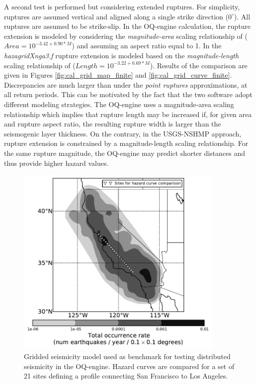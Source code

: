A second test is performed but considering extended ruptures. For simplicity, ruptures are assumed vertical and aligned along a single strike direction ($0^{\circ}$). All ruptures are assumed to be strike-slip. In the OQ-engine calculation, the rupture extension is modeled by considering the \textit{magnitude-area} scaling relationship of \cite{wells1994} ($Area = 10^{-3.42 + 0.90 * M}$) and assuming an aspect ratio equal to 1. In the \textit{hazagridXnga3.f} rupture extension is modeled based on the \textit{magnitude-length} scaling relationship of \cite{wells1994} ($Length = 10^{-3.22+0.69 * M}$). Results of the comparison are given in Figures \ref{fig:cal_grid_map_finite} and \ref{fig:cal_grid_curve_finite}. Discrepancies are much larger than under the \textit{point ruptures} approximations, at all return periods. This can be motivated by the fact that
the two software adopt different modeling strategies. The OQ-engine uses a magnitude-area scaling relationship which implies that rupture length may be increased if, for given area and rupture aspect ratio, the resulting rupture width is larger than the seismogenic layer thickness. On the contrary, in the USGS-NSHMP approach, rupture extension is constrained by a magnitude-length scaling relationship. For the same rupture magnitude, the OQ-engine may predict shorter distances and thus provide higher hazard values.

\begin{figure}
\centering
\includegraphics[width=10cm]{./qareport/pictures/CAmapC_21.pdf}
\caption{Gridded seismicity model used as benchmark for testing distributed seismicity in the OQ-engine. Hazard curves are compared for a set of 21 sites defining a profile connecting San Francisco to Los Angeles.}
\label{fig:cal_grid}
\end{figure}


